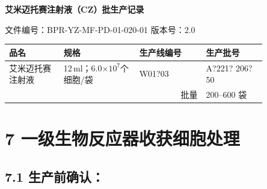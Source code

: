 \documentclass[UTF8,10pt,a4paper,fontset=fandol]{ctexart}
\newcommand{\fieldvalue}[1]{#1}
\newcommand{\handwritten}[1]{#1}
\begin{document}
\newpage

\begin{center}
\textbf{艾米迈托赛注射液（CZ）批生产记录}
\end{center}

\noindent
文件编号：BPR-YZ-MF-PD-01-020-01 \qquad 版本号：2.0

\begin{tabular}{|p{0.18\linewidth}|p{0.25\linewidth}|p{0.22\linewidth}|p{0.20\linewidth}|}
\hline
品名 & 规格 & 生产线编号 & 生产批号 \\ \hline
艾米迈托赛注射液 & 12\,ml；6.0$\times 10^7$个细胞/袋 &
\fieldvalue{\handwritten{W01?03}} &
\fieldvalue{\handwritten{A?221? 206?50}} \\ \hline
\multicolumn{3}{|r|}{批量} & 200--600 袋 \\ \hline
\end{tabular}

\section{7 一级生物反应器收获细胞处理}

\subsection{7.1 生产前确认：}
\end{document}
